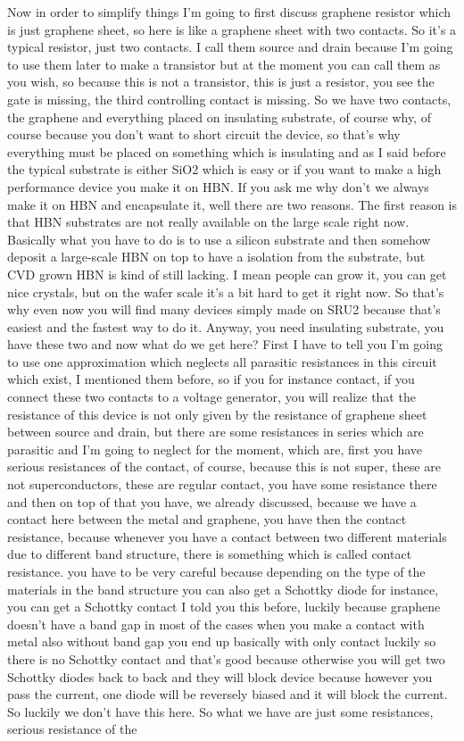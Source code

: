 Now in order to simplify things I'm going to first discuss graphene resistor which is just graphene sheet, so here is like a graphene sheet with two contacts. So it's a typical resistor, just two contacts. I call them source and drain because I'm going to use them later to make a transistor but at the moment you can call them as you wish, so because this is not a transistor, this is just a resistor, you see the gate is missing, the third controlling contact is missing. So we have two contacts, the graphene and everything placed on insulating substrate, of course why, of course because you don't want to short circuit the device, so that's why everything must be placed on something which is insulating and as I said before the typical substrate is either SiO2 which is easy or if you want to make a high performance device you make it on HBN. If you ask me why don't we always make it on HBN and encapsulate it, well there are two reasons. The first reason is that HBN substrates are not really available on the large scale right now. Basically what you have to do is to use a silicon substrate and then somehow deposit a large-scale HBN on top to have a isolation from the substrate, but CVD grown HBN is kind of still lacking. I mean people can grow it, you can get nice crystals, but on the wafer scale it's a bit hard to get it right now. So that's why even now you will find many devices simply made on SRU2 because that's easiest and the fastest way to do it. Anyway, you need insulating substrate, you have these two and now what do we get here? First I have to tell you I'm going to use one approximation which neglects all parasitic resistances in this circuit which exist, I mentioned them before, so if you for instance contact, if you connect these two contacts to a voltage generator, you will realize that the resistance of this device is not only given by the resistance of graphene sheet between source and drain, but there are some resistances in series which are parasitic and I'm going to neglect for the moment, which are, first you have serious resistances of the contact, of course, because this is not super, these are not superconductors, these are regular contact, you have some resistance there and then on top of that you have, we already discussed, because we have a contact here between the metal and graphene, you have then the contact resistance, because whenever you have a contact between two different materials due to different band structure, there is something which is called contact resistance. you have to be very careful because depending on the type of the materials in the band structure you can also get a Schottky diode for instance, you can get a Schottky contact I told you this before, luckily because graphene doesn't have a band gap in most of the cases when you make a contact with metal also without band gap you end up basically with only contact luckily so there is no Schottky contact and that's good because otherwise you will get two Schottky diodes back to back and they will block device because however you pass the current, one diode will be reversely biased and it will block the current. So luckily we don't have this here. So what we have are just some resistances, serious resistance of the 